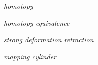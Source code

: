 \begin{defn}
\emph{homotopy}
\end{defn}

\begin{defn}
\emph{homotopy equivalence}
\end{defn}

\begin{defn}
\emph{strong deformation retraction}
\end{defn}

\begin{defn}
\emph{mapping cylinder}
\end{defn}

\begin{defn}
\end{defn}

